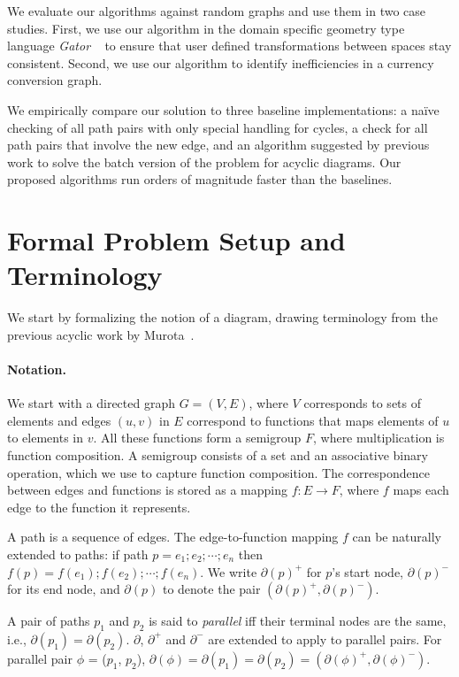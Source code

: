 \documentclass[sigplan,review]{acmart}
\begin{document}
We evaluate our algorithms against random graphs and use them in two case studies.
First, we use our algorithm in the domain specific geometry type language \textit{Gator} ~\cite{gator} to ensure that user defined transformations between spaces stay consistent.
Second, we use our algorithm to identify inefficiencies in a currency conversion graph.

We empirically compare our solution to three baseline implementations: a na\"{i}ve checking of all path pairs with only special handling for cycles, a check for all path pairs that involve the new edge, and an algorithm suggested by previous work to solve the batch version of the problem for acyclic diagrams.
Our proposed algorithms run orders of magnitude faster than the baselines.

\section{Formal Problem Setup and Terminology}

We start by formalizing the notion of a diagram, drawing terminology from the previous acyclic work by Murota~\cite{commutative}.

\paragraph{Notation.}

We start with a directed graph $G=(V,E)$, where $V$ corresponds to sets of elements and edges $(u, v)$ in $E$ correspond to functions that maps elements of $u$ to elements in $v$.
All these functions form a semigroup $F$, where multiplication is function composition.
A semigroup consists of a set and an associative binary operation, which we use to capture function composition.
%
The correspondence between edges and functions is stored as a mapping $f:E\rightarrow F$, where $f$ maps each edge to the function it represents.

A path is a sequence of edges. The edge-to-function mapping $f$ can be naturally extended to paths: if path $p=e_1 ; e_2 ; \cdots ; e_n$ then $f(p)=f(e_1) ; f(e_2) ; \cdots ; f(e_n)$.
%
We write $\partial(p)^{+}$ for $p$'s start node, $\partial(p)^{-}$ for its end node, and $\partial(p)$ to denote the pair
$(\partial(p)^{+}, \partial(p)^{-})$.

A pair of paths $p_1$ and $p_2$ is said to \textit{parallel} iff their terminal nodes are the same, i.e., $\partial(p_1)=\partial(p_2)$.
$\partial$, $\partial^{+}$ and $\partial^{-}$ are extended to apply to parallel pairs.
For parallel pair $\phi$ = ($p_1$, $p_2$), $\partial(\phi)=\partial(p_1)=\partial(p_2)=(\partial(\phi)^{+}, \partial(\phi)^{-})$.
\end{document}

